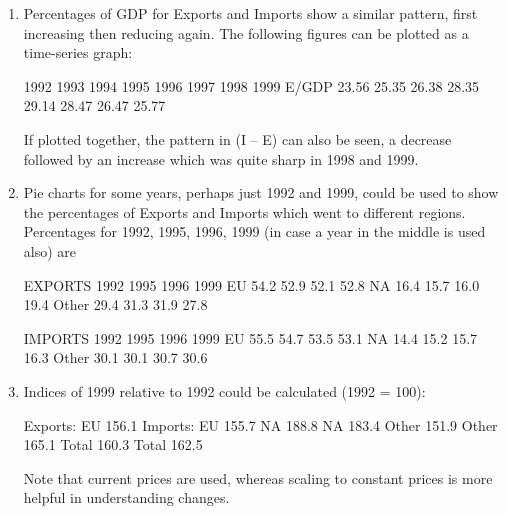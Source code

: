 \documentclass[a4paper,12pt]{article}
\begin{document}
\begin{enumerate}

 
 
\item  Percentages of GDP for Exports and Imports show a similar pattern, first increasing then reducing again.  The following figures can be plotted as a time-series graph: 
 
  1992 1993 1994 1995 1996 1997 1998 1999 E/GDP 23.56 25.35 26.38 28.35 29.14 28.47 26.47 25.77         %
 
If plotted together, the pattern in (I – E) can also be seen, a decrease followed by an increase which was quite sharp in 1998 and 1999. 
 
\item Pie charts for some years, perhaps just 1992 and 1999, could be used to show the percentages of Exports and Imports which went to different regions.  Percentages for 1992, 1995, 1996, 1999 (in case a year in the middle is used also) are 
 
EXPORTS 1992 1995 1996 1999 EU 54.2 52.9 52.1 52.8 NA 16.4 15.7 16.0 19.4 Other 29.4 31.3 31.9 27.8 
 
IMPORTS 1992 1995 1996 1999 EU 55.5 54.7 53.5 53.1 NA 14.4 15.2 15.7 16.3 Other 30.1 30.1 30.7 30.6 
 
\item  Indices of 1999 relative to 1992 could be calculated (1992 = 100): 
 
Exports: EU 156.1   Imports: EU 155.7   NA 188.8     NA 183.4   Other 151.9     Other 165.1 
   Total 160.3     Total 162.5 
 
 
 
Note that current prices are used, whereas scaling to constant prices is more helpful in understanding changes. 
\end{enumerate}
\end{document}
